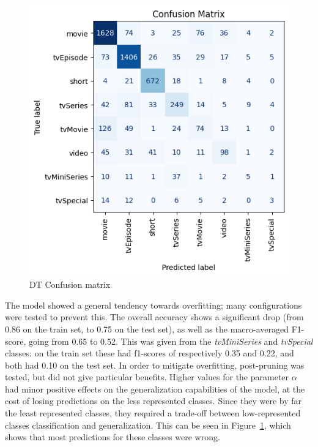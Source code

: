 \begin{figure}
    \centering
    \captionsetup{justification=raggedleft, width=1\linewidth}
    \caption{DT Confusion matrix}
    \label{fig:multiclass_dt_conf_matrix}
    \includegraphics[width=0.9\linewidth]{plots/multiclass_dt_conf_matrix.png}
\end{figure}
The model showed a general tendency towards overfitting; many configurations were tested to prevent
this. The overall accuracy shows a significant drop (from 0.86 on the train set, to 0.75 on the test set),
as well as the macro-averaged F1-score, going from 0.65 to 0.52.
This was given from the \textit{tvMiniSeries} and \textit{tvSpecial} classes: on the train set these had f1-scores of
respectively 0.35 and 0.22, and both had 0.10 on the test set. 
In order to mitigate overfitting, post-pruning was tested, but did not give particular benefits.
Higher values for the parameter $\alpha$ had minor positive effects on the generalization
capabilities of the model, at the cost of losing predictions on the less represented classes.
Since they were by far the least represented classes, they required a trade-off between low-represented classes classification
and generalization. This can be seen in Figure~\ref{fig:multiclass_dt_conf_matrix}, which shows
that most predictions for these classes were wrong.\\

